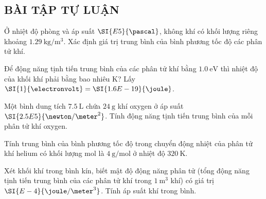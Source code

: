 \subsection{BÀI TẬP TỰ LUẬN}
\setcounter{ex}{0}
\begin{ex}
	Ở nhiệt độ phòng và áp suất $\SI{E5}{\pascal}$, không khí có khối lượng riêng khoảng $\SI{1.29}{\kilogram/\meter^3}$. Xác định giá trị trung bình của bình phương tốc độ các phân tử khí.
\end{ex}
\begin{ex}
	Để động năng tịnh tiến trung bình của các phân tử khí bằng $\SI{1.0}{\electronvolt}$ thì nhiệt độ của khối khí phải bằng bao nhiêu $\si{\kelvin}$? Lấy $\SI{1}{\electronvolt}=\SI{1.6E-19}{\joule}$.
	
\end{ex}
\begin{ex}
	Một bình dung tích $\SI{7.5}{\liter}$ chứa $\SI{24}{\gram}$ khí oxygen ở áp suất $\SI{2.5E5}{\newton/\meter^2}$. Tính động năng tịnh tiến trung bình của mỗi phân tử khí oxygen.
	
\end{ex}
\begin{ex}
	Tính trung bình của bình phương tốc độ trong chuyển động nhiệt của phân tử khí helium có khối lượng mol là $\SI{4}{\gram/\mole}$ ở nhiệt độ $\SI{320}{\kelvin}$.
	
\end{ex}
\begin{ex}
	Xét khối khí trong bình kín, biết mật độ động năng phân tử (tổng động năng tịnh tiến trung bình của các phân tử khí trong $\SI{1}{\meter^3}$ khí) có giá trị $\SI{E-4}{\joule/\meter^3}$. Tính áp suất khí trong bình.
\end{ex}
